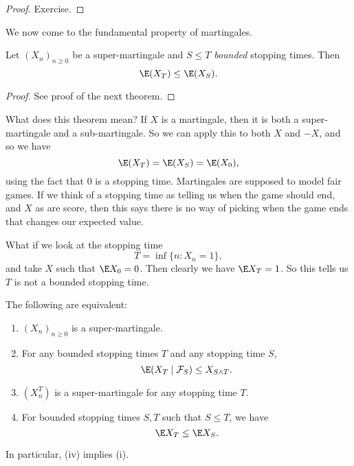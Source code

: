 \documentclass[a4paper]{article}
\begin{document}
\begin{proof}
  Exercise.
\end{proof}
We now come to the fundamental property of martingales.
\begin{thm}
  Let $(X_n)_{n \geq 0}$ be a super-martingale and $S \leq T$ \emph{bounded} stopping times. Then
  \[
    \E(X_T) \leq \E(X_S).
  \]
\end{thm}

\begin{proof}
  See proof of the next theorem.
\end{proof}
What does this theorem mean? If $X$ is a martingale, then it is both a super-martingale and a sub-martingale. So we can apply this to both $X$ and $-X$, and so we have
\[
  \E(X_T) = \E(X_S) = \E(X_0),
\]
using the fact that $0$ is a stopping time. Martingales are supposed to model fair games. If we think of a stopping time as telling us when the game should end, and $X$ as are score, then this says there is no way of picking when the game ends that changes our expected value.

What if we look at the stopping time
\[
  T = \inf \{n : X_n = 1\},
\]
and take $X$ such that $\E X_0 = 0$. Then clearly we have $\E X_T = 1$. So this tells us $T$ is not a bounded stopping time.

\begin{thm}
  The following are equivalent:
  \begin{enumerate}
    \item $(X_n)_{n \geq 0}$ is a super-martingale.
    \item For any bounded stopping times $T$ and any stopping time $S$,
      \[
        \E(X_T \mid \mathcal{F}_S) \leq X_{S \wedge T}.
      \]
    \item $(X_n^T)$ is a super-martingale for any stopping time $T$.
    \item For bounded stopping times $S, T$ such that $S \leq T$, we have
      \[
        \E X_T \leq \E X_S.
      \]
  \end{enumerate}
\end{thm}
In particular, (iv) implies (i).
\end{document}
